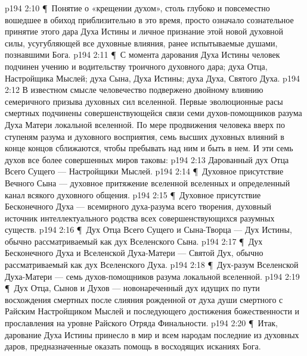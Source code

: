\vs p194 2:10 \P\ Понятие о «крещении духом», столь глубоко и повсеместно вошедшее в обиход приблизительно в это время, просто означало сознательное принятие этого дара Духа Истины и личное признание этой новой духовной силы, усугубляющей все духовные влияния, ранее испытываемые душами, познавшими Бога.
\vs p194 2:11 \P\ С момента дарования Духа Истины человек подчинен учению и водительству троичного духовного дара; духа Отца, Настройщика Мыслей; духа Сына, Духа Истины; духа Духа, Святого Духа.
\vs p194 2:12 В известном смысле человечество подвержено двойному влиянию семеричного призыва духовных сил вселенной. Первые эволюционные расы смертных подчинены совершенствующейся связи семи духов\hyp{}помощников разума Духа Матери локальной вселенной. По мере продвижения человека вверх по ступеням разума и духовного восприятия, семь высших духовных влияний в конце концов сближаются, чтобы пребывать над ним и быть в нем. И эти семь духов все более совершенных миров таковы:
\vs p194 2:13 \bibnobreakspace Дарованный дух Отца Всего Сущего --- Настройщики Мыслей.
\vs p194 2:14 \P\ \bibnobreakspace Духовное присутствие Вечного Сына --- духовное притяжение вселенной вселенных и определенный канал всякого духовного общения.
\vs p194 2:15 \P\ \bibnobreakspace Духовное присутствие Бесконечного Духа --- всемирного духа\hyp{}разума всего творения, духовный источник интеллектуального родства всех совершенствующихся разумных существ.
\vs p194 2:16 \P\ \bibnobreakspace Дух Отца Всего Сущего и Сына\hyp{}Творца --- Дух Истины, обычно рассматриваемый как дух Вселенского Сына.
\vs p194 2:17 \P\ \bibnobreakspace Дух Бесконечного Духа и Вселенской Духа\hyp{}Матери --- Святой Дух, обычно рассматриваемый как дух Вселенского Духа.
\vs p194 2:18 \P\ \bibnobreakspace Дух\hyp{}разум Вселенской Духа\hyp{}Матери --- семь духов\hyp{}помощников разума локальной вселенной.
\vs p194 2:19 \P\ \bibnobreakspace Дух Отца, Сынов и Духов --- новонареченный дух идущих по пути восхождения смертных после слияния рожденной от духа души смертного с Райским Настройщиком Мыслей и последующего достижения божественности и прославления на уровне Райского Отряда Финальности.
\vs p194 2:20 \P\ Итак, дарование Духа Истины принесло в мир и всем народам последние из духовных даров, предназначенные оказать помощь в восходящих исканиях Бога.
